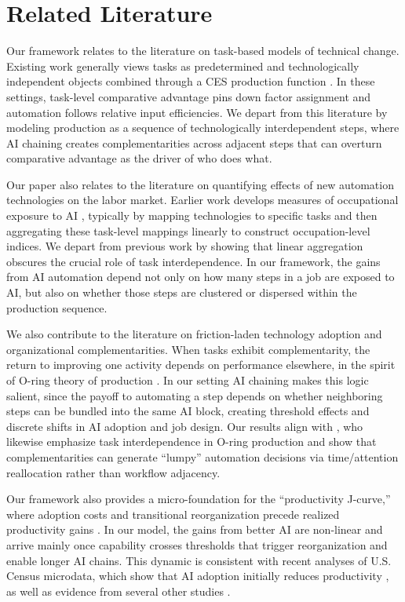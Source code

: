 \section{Related Literature}


Our framework relates to the literature on task-based models of technical change. 
Existing work generally views tasks as predetermined and technologically independent objects combined through a CES production function \citep{acemoglu2011skills, acemoglu2018, acemoglu2019automation, acemoglu2024tasks}.
In these settings, task-level comparative advantage pins down factor assignment and automation follows relative input efficiencies.
We depart from this literature by modeling production as a sequence of technologically interdependent steps, where AI chaining creates complementarities across adjacent steps that can overturn comparative advantage as the driver of who does what.

Our paper also relates to the literature on quantifying effects of new automation technologies on the labor market.
Earlier work develops measures of occupational exposure to AI \citep{frey2017future, brynjolfsson2018can, webb2020impact, felten2021occupational, eloundou2023gpts, tomlinson2025working}, typically by mapping technologies to specific tasks and then aggregating these task-level mappings linearly to construct occupation-level indices.
We depart from previous work by showing that linear aggregation obscures the crucial role of task interdependence.
In our framework, the gains from AI automation depend not only on how many steps in a job are exposed to AI, but also on whether those steps are clustered or dispersed within the production sequence.

We also contribute to the literature on friction-laden technology adoption and organizational complementarities.
When tasks exhibit complementarity, the return to improving one activity depends on performance elsewhere, in the spirit of O-ring theory of production \citep{kremer1993oring}.
In our setting AI chaining makes this logic salient, since the payoff to automating a step depends on whether neighboring steps can be bundled into the same AI block, creating threshold effects and discrete shifts in AI adoption and job design.
Our results align with \citet{gans2026oring}, who likewise emphasize task interdependence in O-ring production and show that complementarities can generate ``lumpy'' automation decisions via time/attention reallocation rather than workflow adjacency.

Our framework also provides a micro-foundation for the ``productivity J-curve,'' where adoption costs and transitional reorganization precede realized productivity gains \citep{brynjolfsson2021productivity}.
In our model, the gains from better AI are non-linear and arrive mainly once capability crosses thresholds that trigger reorganization and enable longer AI chains.
This dynamic is consistent with recent analyses of U.S. Census microdata, which show that AI adoption initially reduces productivity \citep{mcelheran2025rise}, as well as evidence from several other studies \citep{furman2019ai, tambe2012productivity, bonney2024tracking, mcelheran2024adoption}.

